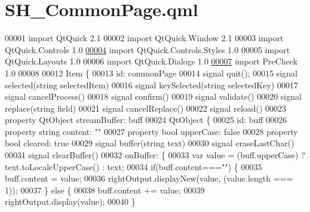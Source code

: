 \hypertarget{SH__CommonPage_8qml}{\section{S\-H\-\_\-\-Common\-Page.\-qml}
\label{SH__CommonPage_8qml}
}

\begin{DoxyCode}
00001 \textcolor{keyword}{import} QtQuick 2.1
00002 import QtQuick.Window 2.1
00003 import QtQuick.Controls 1.0
\hypertarget{SH__CommonPage_8qml_source_l00004}{}\hyperlink{classSH__CommonPage}{00004} import QtQuick.Controls.Styles 1.0
00005 import QtQuick.Layouts 1.0
00006 import QtQuick.Dialogs 1.0
\hypertarget{SH__CommonPage_8qml_source_l00007}{}\hyperlink{classSH__CommonPage_af59ae18e73706e3622c000c2005d9550}{00007} import PreCheck 1.0
00008 
00012 Item \{
00013     \textcolor{keywordtype}{id}: commonPage
00014     signal quit();
00015     signal selected(\textcolor{keywordtype}{string} selectedItem)
00016     signal keySelected(\textcolor{keywordtype}{string} selectedKey)
00017     signal cancelProcess()
00018     signal confirm()
00019     signal validate()
00020     signal replace(\textcolor{keywordtype}{string} field)
00021     signal cancelReplace()
00022     signal reload()
00023     \textcolor{keyword}{property} QtObject streamBuffer: buff
00024     QtObject \{
00025         \textcolor{keywordtype}{id}: buff
00026         \textcolor{keyword}{property} \textcolor{keywordtype}{string} content: \textcolor{stringliteral}{""}
00027         \textcolor{keyword}{property} \textcolor{keywordtype}{bool} upperCase: \textcolor{keyword}{false}
00028         \textcolor{keyword}{property} \textcolor{keywordtype}{bool} cleared: \textcolor{keyword}{true}
00029         signal buffer(\textcolor{keywordtype}{string} text)
00030         signal eraseLastChar()
00031         signal clearBuffer()
00032         onBuffer: \{
00033             var value = (buff.upperCase) ? text.toLocaleUpperCase() : text;
00034             \textcolor{keywordflow}{if}(buff.content===\textcolor{stringliteral}{""}) \{
00035                 buff.content = value;
00036                 rightOutput.displayNew(value, (value.length === 1));
00037             \} \textcolor{keywordflow}{else} \{
00038                 buff.content += value;
00039                 rightOutput.display(value);
00040             \}

\end{DoxyCode}
